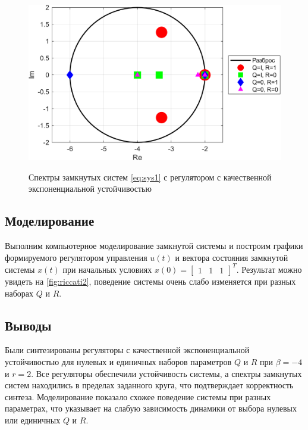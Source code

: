 \begin{figure}[H]
    \centering
    \caption{Спектры замкнутых систем \eqref{eq:sys1} с регулятором с 
    качественной экспоненциальной устойчивостью}
    \includegraphics[width=\linewidth]{figs/task3.png}
    \label{fig:riccati1}
\end{figure}


\subsection{Моделирование}

Выполним компьютерное моделирование замкнутой системы и построим
графики формируемого регулятором управления $u(t)$ и вектора состояния
замкнутой системы $x(t)$ при начальных условиях $x(0) =\begin{bmatrix}
    1&1&1
\end{bmatrix}^T$. Результат можно увидеть на \autoref{fig:riccati2},
поведение системы очень слабо изменяется при разных наборах
$Q$ и $R$.


\subsection{Выводы}

Были синтезированы регуляторы с качественной экспоненциальной устойчивостью для 
нулевых и единичных наборов параметров $Q$ и $R$ при $\beta=-4$ и $r=2$. Все 
регуляторы обеспечили устойчивость 
системы, а спектры замкнутых систем находились в пределах заданного круга, что 
подтверждает корректность синтеза. Моделирование показало схожее поведение системы 
при разных параметрах, что указывает на слабую зависимость динамики от выбора 
нулевых или единичных $Q$ и $R$.


